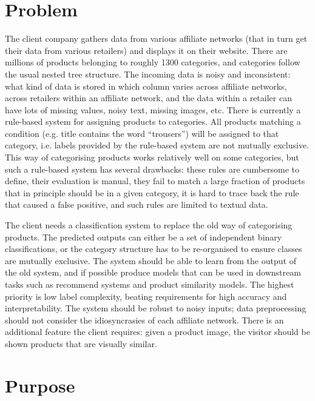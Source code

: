 \section{Problem}

The client company gathers data from various affiliate networks (that in turn get their data from various retailers) and displays it on their website.
There are millions of products belonging to roughly 1300 categories, and categories follow the usual nested tree structure.
The incoming data is noisy and inconsistent: what kind of data is stored in which column varies across affiliate networks, across retailers within an affiliate network, and the data within a retailer can have lots of missing values, noisy text, missing images, etc.
There is currently a rule-based system for assigning products to categories. All products matching a condition (e.g. title contains the word ``trousers'') will be assigned to that category, i.e. labels provided by the rule-based system are not mutually exclusive.
This way of categorising products works relatively well on some categories, but such a rule-based system has several drawbacks: these rules are cumbersome to define, their evaluation is manual, they fail to match a large fraction of products that in principle should be in a given category, it is hard to trace back the rule that caused a false positive, and such rules are limited to textual data.

The client needs a classification system to replace the old way of categorising products.
The predicted outputs can either be a set of independent binary classifications, or the category structure has to be re-organised to ensure classes are mutually exclusive.
The system should be able to learn from the output of the old system, and if possible produce models that can be used in downstream tasks such as recommend systems and product similarity models.
The highest priority is low label complexity, beating requirements for high accuracy and interpretability.
The system should be robust to  noisy inputs; data preprocessing should not consider the idiosyncrasies of each affiliate network.
There is an additional feature the client requires: given a product image, the visitor should be shown products that are visually similar.

\section{Purpose}


